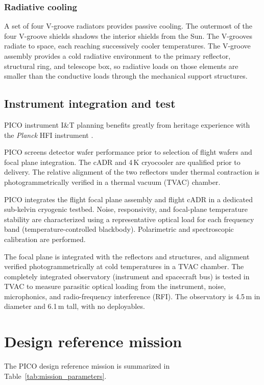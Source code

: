 \subsubsection{Radiative cooling}
\label{sec:radiative_cooling} %

A set of four V-groove radiators provides passive cooling. The
outermost of the four V-groove shields shadows the interior shields
from the Sun. The V-grooves radiate to space, each reaching
successively cooler temperatures. The V-groove
assembly provides a cold radiative environment to the primary
reflector, structural ring, and telescope box, so radiative loads on
those elements are smaller than the conductive loads through the
mechanical support structures.


\subsection{Instrument integration and test}
\label{sec:iandt} %

PICO instrument I\&T planning benefits greatly from heritage
experience with the \textit{Planck} HFI instrument \citep{ Pajot2010}.

PICO screens detector wafer performance prior to selection of
flight wafers and focal plane integration. The cADR and 4\,K
cryocooler are qualified prior to delivery. The relative alignment
of the two reflectors under thermal contraction is
photogrammetrically verified in a thermal vacuum (TVAC) chamber.

PICO integrates the flight focal plane assembly and flight cADR in
a dedicated sub-kelvin cryogenic testbed. Noise, responsivity, and focal-plane
temperature stability are characterized using a representative
optical load for each frequency band (temperature-controlled
blackbody). Polarimetric and spectroscopic calibration are
performed.

The focal plane is integrated with the reflectors and structures, and
alignment verified photogrammetrically at cold temperatures in a TVAC
chamber.  The completely integrated observatory (instrument and
spacecraft bus) is tested in TVAC to measure parasitic optical loading
from the instrument, noise, microphonics, and radio-frequency
interference (RFI). The observatory is 4.5\,m in diameter and 6.1\,m
tall, with no deployables.

\bigskip
\section{Design reference mission}
\label{sec:design_reference} %
The PICO design reference mission is summarized in Table~\ref{tab:mission_parameters}.

